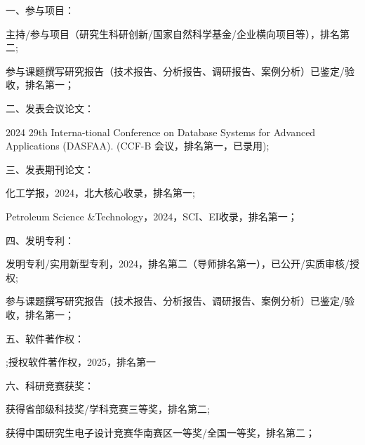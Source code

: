 \noindent 一、参与项目：
\begin{enumerate}[label={[\arabic*]}]
    \item 主持/参与项目（研究生科研创新/国家自然科学基金/企业横向项目等），排名第二;
    \item 参与课题撰写研究报告（技术报告、分析报告、调研报告、案例分析）已鉴定/验收，排名第一；
\end{enumerate}

\noindent 二、发表会议论文：
\begin{enumerate}[label={[\arabic*]}]
    \item 2024 29th Interna-tional Conference on Database Systems for Advanced Applications (DASFAA). (CCF-B 会议，排名第一，已录用);
\end{enumerate}

\noindent 三、发表期刊论文：
\begin{enumerate}[label={[\arabic*]}]
    \item 化工学报，2024，北大核心收录，排名第一;
    \item Petroleum Science \&Technology，2024，SCI、EI收录，排名第一；
\end{enumerate}

\noindent 四、发明专利：
\begin{enumerate}[label={[\arabic*]}]
    \item 发明专利/实用新型专利，2024，排名第二（导师排名第一），已公开/实质审核/授权;
    \item 参与课题撰写研究报告（技术报告、分析报告、调研报告、案例分析）已鉴定/验收，排名第一；
\end{enumerate}

\noindent 五、软件著作权：
\begin{enumerate}[label={[\arabic*]}]
    \item ;授权软件著作权，2025，排名第一
\end{enumerate}

\noindent 六、科研竞赛获奖：
\begin{enumerate}[label={[\arabic*]}]
    \item 获得省部级科技奖/学科竞赛三等奖，排名第二;
    \item 获得中国研究生电子设计竞赛华南赛区一等奖/全国一等奖，排名第二；
\end{enumerate}
